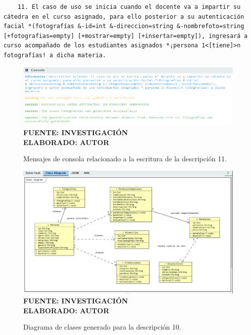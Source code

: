 \begin{lstlisting}
	11. El caso de uso se inicia cuando el docente va a impartir su cátedra en el curso asignado, para ello posterior a su autenticación facial *(fotografías &-id=int &-direccion=string &-nombrefoto=string [+fotografias=empty] [+mostrar=empty] [+insertar=empty]), ingresará a curso acompañado de los estudiantes asignados *¡persona 1<[tiene]>n fotografías! a dicha materia.
\end{lstlisting}

     \begin{figure}[h!]
     	\centering
	\caption{Mensajes de consola relacionado a la escritura de la descripción 11.}
	\includegraphics[width=14cm]{img/not-eva-011.png}
	\label{fig:not_eva_011}
	\vspace{4mm}
	{\footnotesize \textbf{\\ FUENTE: INVESTIGACIÓN} \textbf{\\ ELABORADO: AUTOR}}
\end{figure}

\begin{figure}[H]
	\centering
	\caption{Diagrama de clases generado para la descripción 10.}
	\includegraphics[width=15cm]{img/dc-eva-011.png}
	\label{fig:dc_eva_011}
	\vspace{4mm}
	{\footnotesize \textbf{\\ FUENTE: INVESTIGACIÓN} \textbf{\\ ELABORADO: AUTOR}}
\end{figure}

